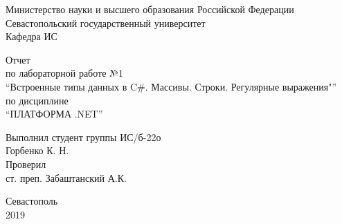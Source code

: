 \documentclass[a4paper,14pt]{extarticle}
\newcommand{\mylabnumber}{1}
\newcommand{\mylabtitle}{Встроенные типы данных в C\#. Массивы. Строки. Регулярные выражения}
\newcommand{\mysubject}{Платформа .NET}
\newcommand{\mylecturer}{ст. преп. Забаштанский А.К.}
\begin{document}


    \begin{titlepage}
        
        \thispagestyle{empty}
        
        \begin{center}
            
            Министерство науки и высшего образования Российской Федерации \\
            Севастопольский государственный университет \\
            Кафедра ИС
            
            \vfill

            Отчет \\
            по лабораторной работе №\mylabnumber \\
            \enquote{\mylabtitle"} \\
            по дисциплине \\
            \enquote{\MakeTextUppercase{\mysubject}}

        \end{center}

        \vspace{1cm}

        \noindent\hspace{7.5cm} Выполнил студент группы ИС/б-22о \\
        \null\hspace{7.5cm} Горбенко К. Н. \\
        \null\hspace{7.5cm} Проверил \\
        \null\hspace{7.5cm} \mylecturer

        \vfill

        \begin{center}
            Севастополь \\
            2019
        \end{center}

    \end{titlepage}
\end{document}
